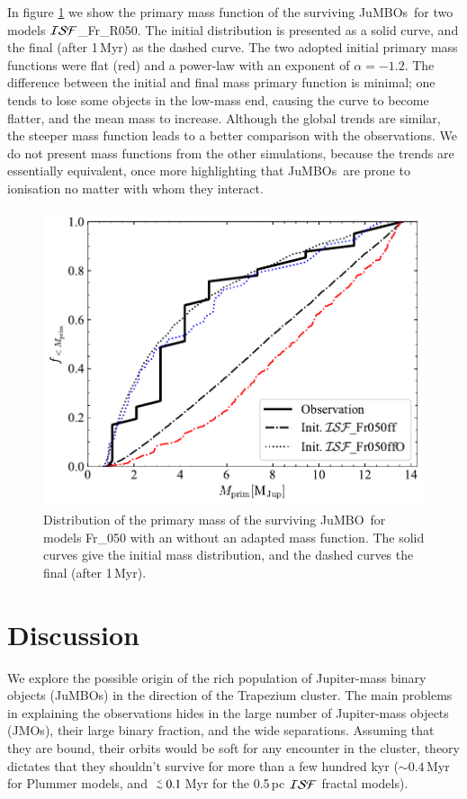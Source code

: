 \documentclass[submission,phys]{lib/SciPost}
\def\aplt{\ {\raise-.5ex\hbox{$\buildrel<\over\sim$}}\ }
\newcommand{\jumbo}{\mbox{JuMBO}}
\newcommand{\jumbos}{\mbox{JuMBOs}}
\begin{document}
In figure \ref{Fig:Mdistr_F05} we show the primary mass function of
the surviving \jumbos\, for two models ${\cal ISF}$\_Fr\_R050.  The
initial distribution is presented as a solid curve, and the final (after
1\,Myr) as the dashed curve. The two adopted initial primary mass
functions were flat (red) and a power-law with an exponent of $\alpha=-1.2$. The difference between the initial and final
mass primary function is minimal; one tends to lose some objects in
the low-mass end, causing the curve to become flatter, and
the mean mass to increase. 
Although the global trends are similar, the steeper mass function
leads to a better comparison with the observations.  We do not present
mass functions from the other simulations, because the trends are essentially 
equivalent, once more highlighting that \jumbos\ are prone to
ionisation no matter with whom they interact.

\begin{figure}
    \centering
    \includegraphics[width=0.75\columnwidth]{figures/Frac_FF_GenObs_mprim.pdf}
    \caption{Distribution of the primary mass of the surviving
      \jumbo\, for models Fr\_050 with an without an adapted mass
      function. The solid curves give the initial mass distribution,
      and the dashed curves the final (after 1\,Myr).}
         \label{Fig:Mdistr_F05}
\end{figure}

\section{Discussion}\label{Sect:Discussion}

We explore the possible origin of the rich population of Jupiter-mass
binary objects (\jumbos) in the direction of the Trapezium cluster.
The main problems in explaining the observations hides in the large
number of Jupiter-mass objects (JMOs), their large binary fraction, and the
wide separations. Assuming that they are bound, their orbits would be
soft for any encounter in the cluster, theory dictates that they shouldn't
survive for more than a few hundred kyr ($\sim 0.4$\,Myr for Plummer
models, and $\aplt 0.1$\,Myr for the 0.5\,pc ${\cal ISF}$ fractal
models).
\end{document}
